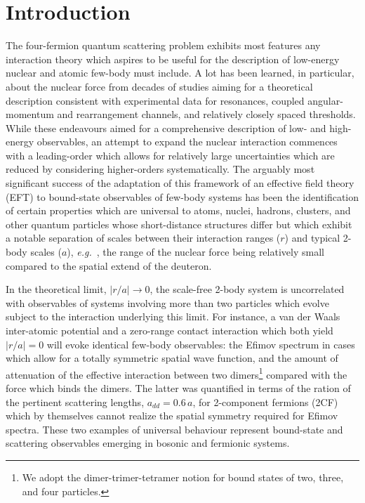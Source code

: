 \documentclass[aps,twocolumn,preprintnumbers,amsmath,amssymb,nofootinbib,superscriptaddress,notitlepage]{revtex4-1}
\newcommand{\eg}{\textit{e.g.}~}
\begin{document}
\section{Introduction}
The four-fermion quantum scattering problem exhibits most features any interaction theory
which aspires to be useful for the description of low-energy nuclear and atomic few-body
must include. A lot has been learned, in particular, about the nuclear force from decades of
studies aiming for a theoretical description consistent with experimental data for resonances,
coupled angular-momentum and rearrangement channels, and relatively closely spaced thresholds.
While these endeavours aimed for a comprehensive description of low- and high-energy observables,
an attempt to expand the nuclear interaction commences with a leading-order which allows for
relatively large uncertainties which are reduced by considering higher-orders systematically.
The arguably most significant success of the adaptation of this framework of an effective field
theory (EFT) to bound-state observables of few-body systems has been the identification of certain
properties which are universal to atoms, nuclei, hadrons, clusters, and other quantum particles
whose short-distance structures differ but which exhibit a notable separation of scales between
their interaction ranges ($r$) and typical 2-body scales ($a$), \eg, the range of the nuclear force being relatively
small compared to the spatial extend of the deuteron.

In the theoretical limit, $\vert r/a\vert\to 0$, the scale-free 2-body system is uncorrelated
with observables of systems involving more than two particles which evolve subject to the
interaction underlying this limit. For instance, a van der Waals inter-atomic potential and
a zero-range contact interaction which both yield $\vert r/a\vert= 0$ will evoke identical few-body
observables: the Efimov spectrum in cases which allow for a totally symmetric spatial wave function,
and the amount of attenuation of the effective interaction between two dimers\footnote{We adopt the dimer-trimer-tetramer
notion for bound states of two, three, and four particles.} compared with the force which
binds the dimers. The latter was quantified in terms of the ration of the pertinent scattering lengths,
$a_{dd}=0.6\,a$, for 2-component fermions (2CF) which by themselves cannot realize the spatial symmetry required
for Efimov spectra. These two examples of universal behaviour represent bound-state and scattering observables
emerging in bosonic and fermionic systems.
\end{document}
